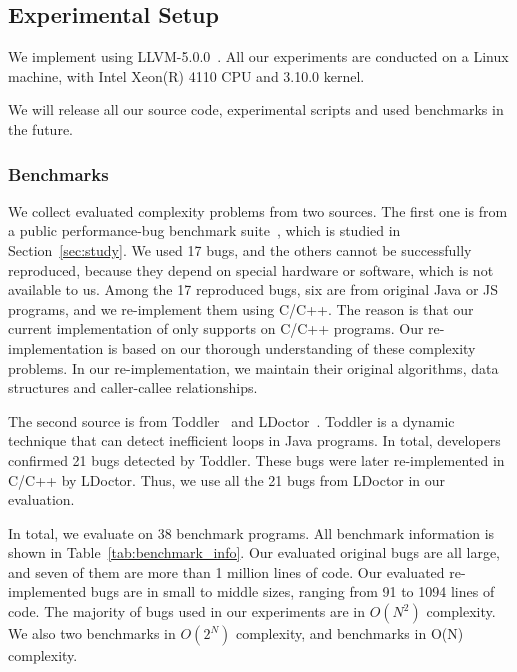 \subsection{Experimental Setup}

We implement \Tool using LLVM-5.0.0~\cite{llvm}. 
All our experiments are conducted on a Linux machine, 
with Intel Xeon(R) 4110 CPU and 3.10.0 kernel.

We will release all our source code, experimental scripts 
and used benchmarks in the future. 




\subsubsection{Benchmarks}

We collect evaluated complexity problems from two sources. 
The first one is
from a public performance-bug benchmark 
suite~\cite{PerfBug,SongOOPSLA2014,ldoctor}, which is
studied in Section~\ref{sec:study}.
We used 17 bugs, and the others cannot be successfully
reproduced, because they depend on special hardware 
or software, which is not available to us. 
Among the 17 reproduced bugs, six are from
original Java or JS programs, 
and we re-implement them using C/C++.
The reason is that our current implementation of \Tool 
only supports on C/C++ programs.
Our re-implementation is based on our thorough 
understanding of these complexity problems.
In our re-implementation, we maintain 
their original algorithms, 
data structures and caller-callee relationships. 


The second source is from Toddler~\cite{Alabama} and LDoctor~\cite{ldoctor}. 
Toddler is a dynamic technique that can detect inefficient loops in Java programs.
In total, developers confirmed 21 bugs detected by Toddler. 
These bugs were later re-implemented in C/C++ by LDoctor. 
Thus, we use all the 21 bugs from LDoctor in our evaluation.  


In total, we evaluate \Tool on 38 benchmark programs. 
All benchmark information is shown in Table~\ref{tab:benchmark_info}. 
Our evaluated original bugs are all large, and seven of them 
are more than 1 million lines of code.
Our evaluated re-implemented bugs are in small to middle sizes, 
ranging from 91 to 1094 lines of code. 
The majority of bugs used in our experiments are in $O(N^2)$ complexity. 
We also two benchmarks in $O(2^N)$ complexity, 
and {\color{red}{XXX}} benchmarks in O(N) complexity.

